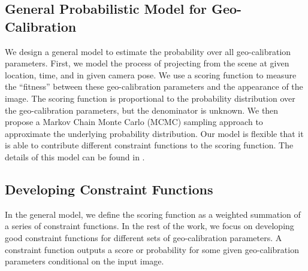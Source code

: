 \subsection{General Probabilistic Model for Geo-Calibration}
We design a general model to estimate the probability over all
geo-calibration parameters. First, we model the process of projecting
from the scene at given location, time, and in given camera pose.
We use a scoring function to measure the ``fitness'' between these
geo-calibration parameters and the appearance of the image. 
The scoring function is proportional to the probability distribution
over the geo-calibration parameters, but the denominator is unknown. We
then propose a Markov Chain Monte Carlo (MCMC) sampling approach to
approximate the underlying probability distribution.
Our model is flexible that it is able to contribute different
constraint functions to the scoring function. The details of this model
can be found in .

\subsection{Developing Constraint Functions}
In the general model, we define the scoring function as a weighted
summation of a series of constraint functions.
In the rest of the work, we focus on developing good constraint
functions for different sets of geo-calibration parameters. 
A constraint function outputs a score or probability for some given
geo-calibration parameters conditional on the input image.


